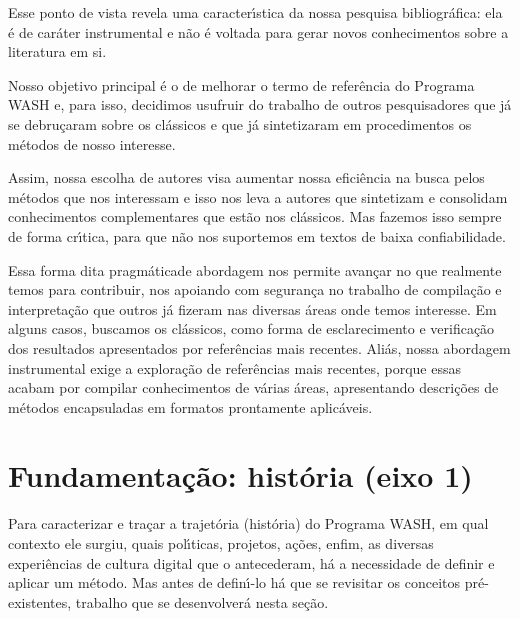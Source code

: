 \documentclass[
12pt,		%
openright,	%
twoside,  %
a4paper,			%
chapter=TITLE,		%
english,			%
french,				%
spanish,			%
brazil				%
]{USPSC-classe/USPSC}
\begin{document}
Esse ponto de vista revela uma caracter\'{\i}stica da nossa pesquisa bibliogr\'afica: ela \'e de car\'ater instrumental e n\~ao \'e voltada para gerar novos conhecimentos sobre a literatura em si.




Nosso objetivo principal \'e o de melhorar o termo de refer\^encia do Programa WASH e, para isso, decidimos usufruir do trabalho de outros pesquisadores que j\'a se debru\c{c}aram sobre os cl\'assicos e que j\'a sintetizaram em procedimentos os m\'etodos de nosso interesse.




Assim, nossa escolha de autores visa aumentar nossa efici\^encia na busca pelos m\'etodos que nos interessam e isso nos leva a autores que sintetizam e consolidam conhecimentos complementares que est\~ao nos cl\'assicos. Mas fazemos isso sempre de forma cr\'{\i}tica, para que n\~ao nos suportemos em textos de baixa confiabilidade.




Essa forma dita \textquotedbl pragm\'atica\textquotedbl  de abordagem nos permite avan\c{c}ar no que realmente temos para contribuir, nos apoiando com seguran\c{c}a no trabalho de compila\c{c}\~ao e interpreta\c{c}\~ao que outros j\'a fizeram nas diversas \'areas onde temos interesse. Em alguns casos, buscamos os cl\'assicos, como forma de esclarecimento e verifica\c{c}\~ao dos resultados apresentados por refer\^encias mais recentes. Ali\'as, nossa abordagem instrumental exige a explora\c{c}\~ao de refer\^encias mais recentes, porque essas acabam por compilar conhecimentos de v\'arias \'areas, apresentando descri\c{c}\~oes de m\'etodos encapsuladas em formatos prontamente aplic\'aveis.




\section[Fundamenta\c{c}\~ao: hist\'oria (eixo 1)]{Fundamenta\c{c}\~ao: hist\'oria (eixo 1)}\label{Fundamenta\c{c}\~ao: hist\'oria (eixo 1)}
Para caracterizar e tra\c{c}ar a trajet\'oria (hist\'oria) do Programa WASH, em qual contexto ele surgiu, quais pol\'{\i}ticas, projetos, a\c{c}\~oes, enfim, as diversas experi\^encias de cultura digital que o antecederam, h\'a a necessidade de definir e aplicar um m\'etodo. Mas antes de defin\'{\i}-lo h\'a que se revisitar os conceitos pr\'e-existentes, trabalho que se desenvolver\'a nesta se\c{c}\~ao.
\end{document}
